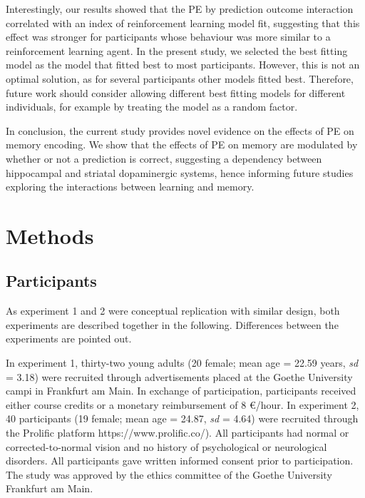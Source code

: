 \documentclass[a4paper,12pt]{article}
\begin{document}
\par
Interestingly, our results showed that the PE by prediction outcome interaction correlated with an index of reinforcement learning model fit, suggesting that this effect was stronger for participants whose behaviour was more similar to a reinforcement learning agent. In the present study, we selected the best fitting model as the model that fitted best to most participants. However, this is not an optimal solution, as for several participants other models fitted best. Therefore, future work should consider allowing different best fitting models for different individuals, for example by treating the model as a random factor.  

In conclusion, the current study provides novel evidence on the effects of PE on memory encoding. We show that the effects of PE on memory are modulated by whether or not a prediction is correct, suggesting a dependency between hippocampal and striatal dopaminergic systems, hence informing future studies exploring the interactions between learning and memory. 



\section{Methods}
\subsection{Participants}
As experiment 1 and 2 were conceptual replication with similar design, both experiments are described together in the following. Differences between the experiments are pointed out. \par
In experiment 1, thirty-two young adults (20 female; mean age = 22.59 years, \textit{sd} = 3.18) were recruited through advertisements placed at the Goethe University campi in Frankfurt am Main. In exchange of participation, participants received either course credits or a monetary reimbursement of 8 €/hour. 
In experiment 2, 40 participants (19 female; mean age = 24.87, \textit{sd} = 4.64) were recruited through the Prolific platform https://www.prolific.co/). All participants had normal or corrected-to-normal vision and no history of psychological or neurological disorders. All participants gave written informed consent prior to participation. The study was approved by the ethics committee of the Goethe University Frankfurt am Main. 
\end{document}
